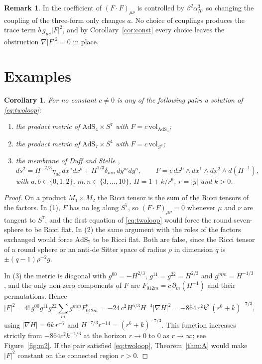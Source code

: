 \documentclass[11pt]{amsart}
\newtheorem{corollary}[theorem]{Corollary}
\theoremstyle{definition}
\newtheorem{remark}[theorem]{Remark}
\newcommand{\FF}{(F\!\cdot\! F)}
\begin{document}
\begin{remark}\label{rem:beta}
In \cite{Kak00} the coefficient of $\FF_{\mu\nu}$ is controlled by $\beta^2\alpha_R^3$, so changing the coupling of the three-form only changes $a$. No choice of couplings produces the trace term $b\,g_{\mu\nu}|F|^2$, and by Corollary~\ref{cor:const} every choice leaves the obstruction $\nabla|F|^2=0$ in place.
\end{remark}

\section{Examples}\label{sec:examples}

\begin{corollary}\label{cor:examples}
For no constant $c\neq0$ is any of the following pairs a solution of \eqref{eq:twoloop}:
\begin{enumerate}
\item the product metric of $\mathrm{AdS}_4\times S^7$ with $F=c\,\mathrm{vol}_{\mathrm{AdS}_4}$;
\item the product metric of $\mathrm{AdS}_7\times S^4$ with $F=c\,\mathrm{vol}_{S^4}$;
\item the membrane of Duff and Stelle \cite{DS91},
\[
ds^2=H^{-2/3}\eta_{ab}\,dx^a dx^b+H^{1/3}\delta_{mn}\,dy^m dy^n,\qquad F=c\,dx^0\wedge dx^1\wedge dx^2\wedge d(H^{-1}),
\]
with $a,b\in\{0,1,2\}$, $m,n\in\{3,\dots,10\}$, $H=1+k/r^6$, $r=|y|$ and $k>0$.
\end{enumerate}
\end{corollary}

\begin{proof}
On a product $M_1\times M_2$ the Ricci tensor is the sum of the Ricci tensors of the factors. In (1), $F$ has no leg along $S^7$, so $\FF_{\mu\nu}=0$ whenever $\mu$ and $\nu$ are tangent to $S^7$, and the first equation of \eqref{eq:twoloop} would force the round seven-sphere to be Ricci flat. In (2) the same argument with the roles of the factors exchanged would force $\mathrm{AdS}_7$ to be Ricci flat. Both are false, since the Ricci tensor of a round sphere or an anti-de Sitter space of radius $\rho$ in dimension $q$ is $\pm(q-1)\rho^{-2}g$.

In (3) the metric is diagonal with $g^{00}=-H^{2/3}$, $g^{11}=g^{22}=H^{2/3}$ and $g^{mm}=H^{-1/3}$, and the only non-zero components of $F$ are $F_{012m}=c\,\partial_m(H^{-1})$ and their permutations. Hence
\[
|F|^2=4!\,g^{00}g^{11}g^{22}\sum_m g^{mm}F_{012m}^2=-24\,c^2H^{5/3}H^{-4}|\nabla H|^2=-864\,c^2k^2\,(r^6+k)^{-7/3},
\]
using $|\nabla H|=6k\,r^{-7}$ and $H^{-7/3}r^{-14}=(r^6+k)^{-7/3}$. This function increases strictly from $-864c^2k^{-1/3}$ at the horizon $r\to0$ to $0$ as $r\to\infty$; see Figure~\ref{fig:m2}. If the pair satisfied \eqref{eq:twoloop}, Theorem~\ref{thm:A} would make $|F|^2$ constant on the connected region $r>0$.
\end{proof}
\end{document}
